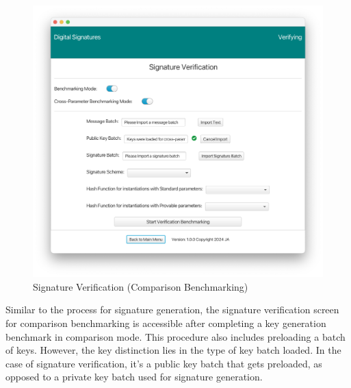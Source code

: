\documentclass[]{final_report}
\theoremstyle{definition}
\begin{document}
\begin{figure}[H]
    \centering
    \includegraphics[scale= 0.4]{main_pictures/ui/verifying/verifying0.png}
    \caption{Signature Verification (Comparison Benchmarking)}
\end{figure}

Similar to the process for signature generation, the signature verification screen for comparison benchmarking is accessible after completing a key generation benchmark in comparison mode. This procedure also includes preloading a batch of keys. However, the key distinction lies in the type of key batch loaded. In the case of signature verification, it's a public key batch that gets preloaded, as opposed to a private key batch used for signature generation.
\end{document}
